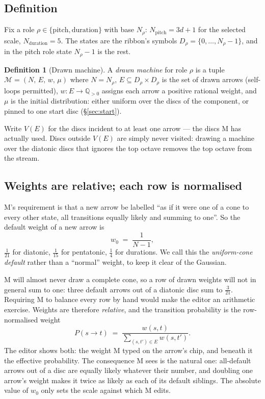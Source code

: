 \documentclass[11pt,a4paper]{article}
\theoremstyle{definition}
\newtheorem{definition}{Definition}
\theoremstyle{plain}
\theoremstyle{remark}
\begin{document}
\subsection{Definition}

Fix a role $\rho\in\{\text{pitch},\text{duration}\}$ with base $N_\rho$: $N_{\text{pitch}}=3d+1$ for
the selected scale, $N_{\text{duration}}=5$. The states are the ribbon's symbols
$D_\rho=\{0,\dots,N_\rho-1\}$, and in the pitch role state $N_\rho-1$ is the rest.

\begin{definition}[Drawn machine]
A \emph{drawn machine} for role $\rho$ is a tuple $\mathcal{M}=(N,\,E,\,w,\,\mu)$ where $N=N_\rho$,
$E\subseteq D_\rho\times D_\rho$ is the set of drawn arrows (self-loops permitted),
$w:E\to\mathbb{Q}_{>0}$ assigns each arrow a positive rational weight, and $\mu$ is the initial
distribution: either uniform over the discs of the component, or pinned to one start disc
(\S\ref{sec:start}).
\end{definition}

Write $V(E)$ for the discs incident to at least one arrow --- the discs M has actually used.
Discs outside $V(E)$ are simply never visited: drawing a machine over the diatonic discs that
ignores the top octave removes the top octave from the stream.

\subsection{Weights are relative; each row is normalised}

M's requirement is that a new arrow be labelled ``as if it were one of a cone to every other state,
all transitions equally likely and summing to one''. So the default weight of a new arrow is
\[
  w_0 \;=\; \frac{1}{N-1},
\]
$\tfrac1{21}$ for diatonic, $\tfrac1{15}$ for pentatonic, $\tfrac14$ for durations. We call this the
\emph{uniform-cone default} rather than a ``normal'' weight, to keep it clear of the Gaussian.

M will almost never draw a complete cone, so a row of drawn weights will not in general sum to one:
three default arrows out of a diatonic disc sum to $\tfrac3{21}$. Requiring M to balance every row by
hand would make the editor an arithmetic exercise. Weights are therefore \emph{relative}, and the
transition probability is the row-normalised weight
\[
  P(s\to t) \;=\; \frac{w(s,t)}{\sum_{(s,t')\in E} w(s,t')} .
\]
The editor shows both: the weight M typed on the arrow's chip, and beneath it the effective
probability. The consequence M sees is the natural one: all-default arrows out of a disc are equally
likely whatever their number, and doubling one arrow's weight makes it twice as likely as each of its
default siblings. The absolute value of $w_0$ only sets the scale against which M edits.
\end{document}

